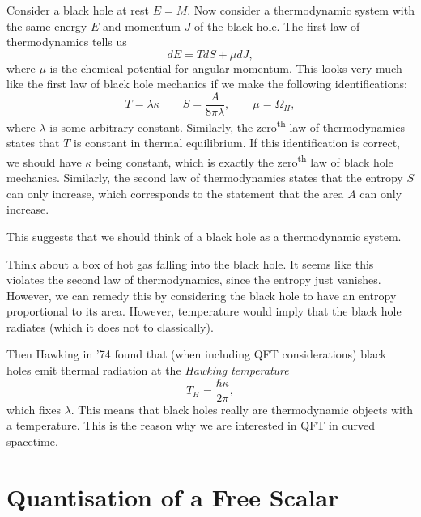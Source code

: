 Consider a black hole at rest $E = M$. Now consider a thermodynamic system with the same energy $E$ and momentum $J$ of the black hole.
The first law of thermodynamics tells us
\begin{equation}
  d E = T dS + \mu d J,
\end{equation}
where $\mu$ is the chemical potential for angular momentum.
This looks very much like the first law of black hole mechanics if we make the following identifications:
\begin{equation}
  T = \lambda \kappa \qquad S = \frac{A}{8 \pi \lambda}, \qquad \mu = \Omega_H,
\end{equation}
where $\lambda$ is some arbitrary constant.
Similarly, the zero\textsuperscript{th} law of thermodynamics states that $T$ is constant in thermal equilibrium.
If this identification is correct, we should have $\kappa$ being constant, which is exactly the zero\textsuperscript{th} law of black hole mechanics.
Similarly, the second law of thermodynamics states that the entropy $S$ can only increase, which corresponds to the statement that the area $A$ can only increase.

This suggests that we should think of a black hole as a thermodynamic system.

Think about a box of hot gas falling into the black hole.
It seems like this violates the second law of thermodynamics, since the entropy just vanishes. However, we can remedy this by considering the black hole to have an entropy proportional to its area.
However, temperature would imply that the black hole radiates (which it does not to classically).

Then Hawking in '74 found that (when including QFT considerations) black holes emit thermal radiation at the \emph{Hawking temperature}
\begin{equation}
  T_H = \frac{\hbar \kappa}{2 \pi},
\end{equation}
which fixes $\lambda$.
This means that black holes really are thermodynamic objects with a temperature.
This is the reason why we are interested in QFT in curved spacetime.

\section{Quantisation of a Free Scalar}%
\label{sec:quantisation_of_a_free_scalar}


